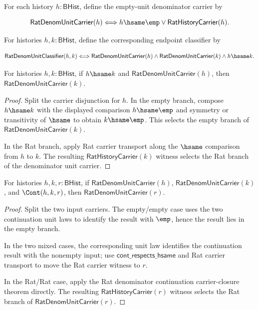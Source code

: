 \begin{definition}
\label{def:field-rat-denominator-unit-carrier}
For each history $h:\mathsf{BHist}$, define the empty-unit denominator carrier
by

$$
\mathsf{RatDenomUnitCarrier}(h)\Longleftrightarrow
h\hsame\emp\lor\mathsf{RatHistoryCarrier}(h).
$$

For histories $h,k:\mathsf{BHist}$, define the corresponding endpoint
classifier by

$$
\mathsf{RatDenomUnitClassifier}(h,k)\Longleftrightarrow
\mathsf{RatDenomUnitCarrier}(h)\land
\mathsf{RatDenomUnitCarrier}(k)\land h\hsame k.
$$
\end{definition}

\begin{theorem}
\label{thm:rat-denom-unit-carrier-hsame-transport}
For histories $h,k:\mathsf{BHist}$, if $h\hsame k$ and
$\mathsf{RatDenomUnitCarrier}(h)$, then
$\mathsf{RatDenomUnitCarrier}(k)$.
\end{theorem}
\begin{proof}
Split the carrier disjunction for $h$. In the empty branch, compose
$h\hsame k$ with the displayed comparison $h\hsame\emp$ and symmetry or
transitivity of $\hsame$ to obtain $k\hsame\emp$. This selects the empty
branch of $\mathsf{RatDenomUnitCarrier}(k)$.

In the Rat branch, apply Rat carrier transport along the $\hsame$ comparison
from $h$ to $k$. The resulting $\mathsf{RatHistoryCarrier}(k)$ witness selects
the Rat branch of the denominator unit carrier.
\end{proof}

\begin{theorem}
\label{thm:rat-denom-unit-carrier-continuation-closed}
For histories $h,k,r:\mathsf{BHist}$, if
$\mathsf{RatDenomUnitCarrier}(h)$, $\mathsf{RatDenomUnitCarrier}(k)$, and
$\Cont(h,k,r)$, then $\mathsf{RatDenomUnitCarrier}(r)$.
\end{theorem}
\begin{proof}
Split the two input carriers. The empty/empty case uses the two continuation
unit laws to identify the result with $\emp$, hence the result lies in the
empty branch.

In the two mixed cases, the corresponding unit law identifies the continuation
result with the nonempty input; use
$\mathsf{cont\_respects\_hsame}$ and Rat carrier transport to move the Rat
carrier witness to $r$.

In the Rat/Rat case, apply the Rat denominator continuation carrier-closure
theorem directly. The resulting $\mathsf{RatHistoryCarrier}(r)$ witness selects
the Rat branch of $\mathsf{RatDenomUnitCarrier}(r)$.
\end{proof}


